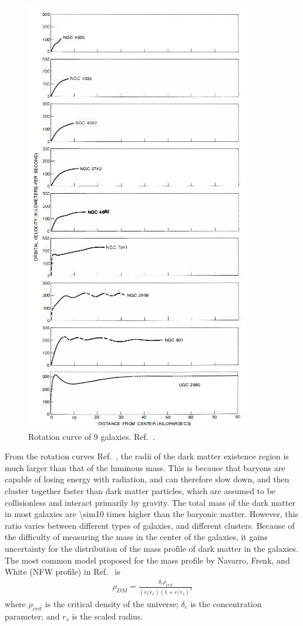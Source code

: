 \begin{figure}
	\centering
	\includegraphics[width=0.7 \textwidth]{Figures/Intro/RotationCurveRubin.jpg}
	\caption[Rotation curve]{Rotation curve of 9 galaxies. Ref.~\cite{Rubin1983}.}
	\label{fig:rotationCurves}
\end{figure}

From the rotation curves Ref.~\cite{Rubin1983, Begeman1991}, the radii of the dark matter existence region is much larger than that of the luminous mass. This is because that baryons are capable of losing energy with radiation, and can therefore slow down, and then cluster together faster than dark matter particles, which are assumed to be collisionless and interact primarily by gravity. %
The total mass of the dark matter in most galaxies are \num{\sim10} times higher than the baryonic matter. However, this ratio varies between different types of galaxies, and different clusters. Because of the difficulty of measuring the mass in the center of the galaxies, it gains uncertainty for the distribution of the mass profile of dark matter in the galaxies. The most common model proposed for the mass profile by Navarro, Frenk, and White (NFW profile) in Ref.~\cite{Navarro1996, Navarro1997} is
\begin{align}
\rho_{DM}= \frac{\delta_c \rho_{crit}}{(r/r_s)(1+r/r_s)^2}
\end{align}
where $\rho_{crit}$ is the critical density of the universe; $\delta_c$ is the concentration parameter; and $r_s$ is the scaled radius. 

